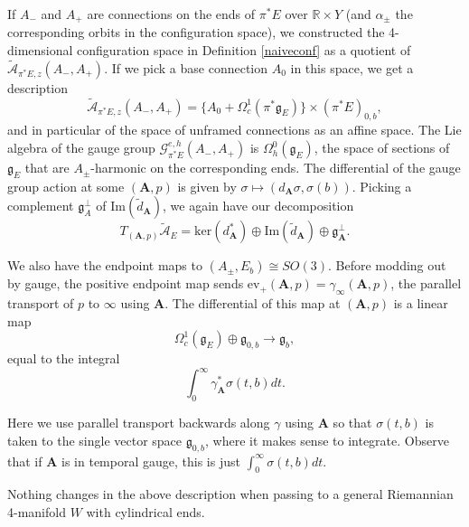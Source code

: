 \documentclass[10pt,a4paper]{amsart}
\newcommand{\pE}{\pi^* \! E}
\theoremstyle{definition}
\theoremstyle{remark}
\numberwithin{figure}{qchap}
\begin{document}
If $A_-$ and $A_+$ are connections on the ends of $\pE$ over $\mathbb R \times Y$ (and $\alpha_\pm$ the corresponding orbits in the configuration space), we constructed the 4-dimensional configuration space in Definition \ref{naiveconf} as a quotient of $\widetilde{\mathcal A}_{\pE,z}(A_-, A_+)$. If we pick a base connection $A_0$ in this space, we get a description 
$$\widetilde{\mathcal A}_{\pE,z}(A_-, A_+) = \{A_0 + \Omega^1_c(\pi^*\mathfrak g_E)\} \times (\pE)_{0,b},$$
and in particular of the space of unframed connections as an affine space. The Lie algebra of the gauge group $\mathcal G^{e,h}_{\pE}(A_-, A_+)$ is $\Omega^0_h(\mathfrak g_E)$, the space of sections of $\mathfrak g_E$ that are $A_\pm$-harmonic on the corresponding ends. The differential of the gauge group action at some $(\mathbf{A}, p)$ is given by $\sigma \mapsto (d_{\mathbf{A}} \sigma, \sigma(b)).$ Picking a complement $\mathfrak g_A^\perp$ of $\text{Im}(\tilde d_{\mathbf{A}})$, we again have our decomposition 
$$T_{(\mathbf{A},p)} \widetilde{\mathcal A}_E = \text{ker}(d_{\mathbf A}^*) \oplus \text{Im}(\tilde d_{\mathbf A}) \oplus \mathfrak g_{\mathbf A}^\perp.$$ 

We also have the endpoint maps to $(A_\pm, E_b) \cong SO(3)$. Before modding out by gauge, the positive endpoint map sends $\text{ev}_+(\mathbf{A},p) = \gamma_\infty(\mathbf{A},p)$, the parallel transport of $p$ to $\infty$ using $\mathbf{A}$. The differential of this map at $(\mathbf{A},p)$ is a linear map 
$$\Omega^1_c(\mathfrak g_E) \oplus \mathfrak g_{0,b} \to \mathfrak g_b,$$ 
equal to the integral 
$$\int_0^\infty \gamma^*_{\mathbf A}\sigma(t,b)dt.$$ 

Here we use parallel transport backwards along $\gamma$ using $\mathbf{A}$ so that $\sigma(t,b)$ is taken to the single vector space $\mathfrak g_{0,b}$, where it makes sense to integrate. Observe that if $\mathbf{A}$ is in temporal gauge, this is just $\int_0^\infty \sigma(t,b)dt$.

Nothing changes in the above description when passing to a general Riemannian 4-manifold $W$ with cylindrical ends. 
\end{document}
